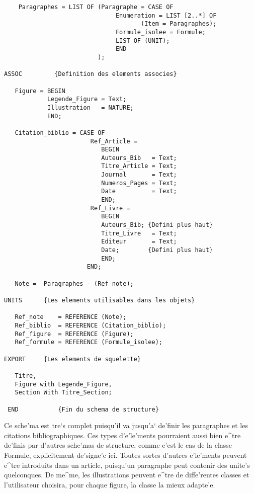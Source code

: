 {\begin{verbatim}
    Paragraphes = LIST OF (Paragraphe = CASE OF
                               Enumeration = LIST [2..*] OF
                                      (Item = Paragraphes);
                               Formule_isolee = Formule;
                               LIST OF (UNIT);
                               END
                          );

ASSOC         {Definition des elements associes}

   Figure = BEGIN
            Legende_Figure = Text;
            Illustration   = NATURE;
            END;

   Citation_biblio = CASE OF
                        Ref_Article =
                           BEGIN
                           Auteurs_Bib   = Text;
                           Titre_Article = Text;
                           Journal       = Text;
                           Numeros_Pages = Text;
                           Date          = Text;
                           END;
                        Ref_Livre =
                           BEGIN
                           Auteurs_Bib; {Defini plus haut}
                           Titre_Livre   = Text;
                           Editeur       = Text;
                           Date;        {Defini plus haut}
                           END;
                       END;

   Note =  Paragraphes - (Ref_note);

UNITS      {Les elements utilisables dans les objets}

   Ref_note    = REFERENCE (Note);
   Ref_biblio  = REFERENCE (Citation_biblio);
   Ref_figure  = REFERENCE (Figure);
   Ref_formule = REFERENCE (Formule_isolee);

EXPORT     {Les elements de squelette}

   Titre,
   Figure with Legende_Figure,
   Section With Titre_Section;

 END           {Fin du schema de structure}
\end{verbatim}

Ce sche'ma est tre`s complet puisqu'il va jusqu'a` de'finir les paragraphes
et les citations bibliographiques. Ces types d'e'le'ments pourraient aussi bien
e^tre de'finis par d'autres sche'mas de structure, comme c'est le cas de la
classe Formule, explicitement de'signe'e ici. Toutes sortes d'autres
e'le'ments peuvent e^tre introduits dans un article, puisqu'un paragraphe
peut contenir des unite's quelconques. De me^me, les illustrations peuvent
e^tre de diffe'rentes classes et l'utilisateur choisira, pour chaque figure,
la classe la mieux adapte'e.

}
